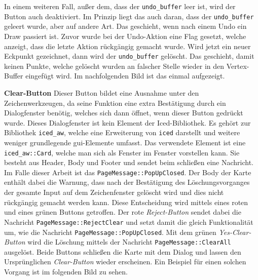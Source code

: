 In einem weiteren Fall, außer dem, dass der \lstinline{undo_buffer} leer ist, wird der Button auch deaktiviert. Im Prinzip liegt das auch daran, dass der \lstinline{undo_buffer} geleert wurde, aber auf andere Art.
Das geschieht, wenn nach einem Undo ein Draw passiert ist. Zuvor wurde bei der Undo-Aktion eine Flag gesetzt, welche anzeigt, dass die letzte Aktion rückgängig gemacht wurde. Wird jetzt ein neuer Eckpunkt gezeichnet, 
dann wird der \lstinline{undo_buffer} gelöscht. Das geschieht, damit keinen Punkte, welche gelöscht wurden an falscher Stelle wieder in den Vertex-Buffer eingefügt wird. Im nachfolgenden Bild ist das einmal aufgezeigt.
\linebreak

\textbf{\small{Clear-Button}}\linebreak
Dieser Button bildet eine Ausnahme unter den Zeichenwerkzeugen, da seine Funktion eine extra Bestätigung durch ein Dialogfenster benötig, welches sich dann öffnet, wenn dieser Button gedrückt wurde. 
Dieses Dialogfenster ist kein Element der Iced-Bibliothek. Es gehört zur Bibliothek \lstinline{iced_aw}, welche eine Erweiterung von \lstinline{iced} darstellt und weitere weniger grundlegende \ac{gui}-Elemente umfasst.
Das verwendete Element ist eine \lstinline{iced_aw::Card}, welche man sich als Fenster im Fenster vorstellen kann. Sie besteht aus Header, Body und Footer und sendet beim schließen eine Nachricht. Im Falle dieser Arbeit ist das 
\lstinline{PageMessage::PopUpClosed}. Der Body der Karte enthält dabei die Warnung, dass nach der Bestätigung des Löschungsvorganges der gesamte Input auf dem Zeichenfenster gelöscht wird und dies nicht rückgängig gemacht werden kann.
Diese Entscheidung wird mittels eines roten und eines grünen Buttons getroffen. Der rote \emph{Reject-Button} sendet dabei die Nachricht \lstinline{PageMessage::RejectClear} und setzt damit die gleich Funktionalität um, wie die Nachricht \lstinline{PageMessage::PopUpClosed}.
Mit dem grünen \emph{Yes-Clear-Button} wird die Löschung mittels der Nachricht \lstinline{PageMessage::ClearAll} ausgelöst. Beide Buttons schließen die Karte mit dem Dialog und lassen den Ursprünglichen \emph{Clear-Button} wieder erscheinen. 
Ein Beispiel für einen solchen Vorgang ist im folgenden Bild zu sehen.
\linebreak 

